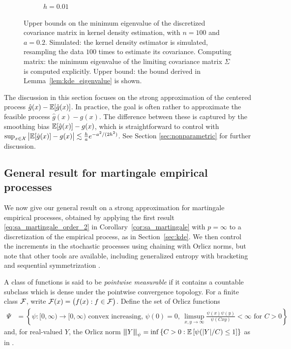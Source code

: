 \begin{figure}[ht]
\begin{subfigure}{0.49\textwidth}
    \caption{$h = 0.01$}
  \end{subfigure}
  \caption{
    Upper bounds on the minimum eigenvalue of the discretized covariance
    matrix in kernel density estimation,
    with $n=100$ and $a = 0.2$.
    Simulated: the kernel density estimator is simulated,
    resampling the data $100$ times
    to estimate its covariance.
    Computing matrix: the minimum eigenvalue of the limiting covariance
    matrix $\Sigma$ is computed explicitly.
    Upper bound: the bound derived in
    Lemma~\ref{lem:kde_eigenvalue}
    is shown.
  }
  \label{fig:min_eig}
\end{figure}

The discussion in this section focuses on the strong approximation of the
centered process $\hat g(x)-\mathbb{E} [ \hat g(x) ]$. In practice, the goal is often
rather to approximate the feasible process $\hat g(x)- g(x)$. The difference
between these is captured by the smoothing bias $\mathbb{E} [ \hat g(x) ] - g(x)$,
which is straightforward to control with
$\sup_{x \in \mathcal{X}} \big| \mathbb{E} [ \hat g(x) ] - g(x) \big|
\lesssim \frac{h}{a} e^{-a^2 / (2 h^2)}$.
See Section \ref{sec:nonparametric} for further
discussion.

\subsection{General result for martingale empirical processes}

We now give our general result on a strong approximation for
martingale empirical processes, obtained by applying
the first result \eqref{eq:sa_martingale_order_2} in
Corollary~\ref{cor:sa_martingale} with $p=\infty$
to a discretization of the empirical process,
as in Section~\ref{sec:kde}.
We then control the increments in the stochastic processes
using chaining with Orlicz norms,
but note that other tools are available,
including generalized entropy with bracketing \citep{geer2000empirical}
and sequential symmetrization \citep{rakhlin2015sequential}.

A class of functions is said to be \emph{pointwise measurable}
if it contains a countable subclass which is dense under
the pointwise convergence topology.
For a finite class $\mathcal{F}$, write
$\mathcal{F}(x) = \big(f(x) : f \in \mathcal{F}\big)$.
Define the set of Orlicz functions
%
\begin{align*}
  \Psi
  &=
  \left\{
    \psi: [0, \infty) \to [0, \infty)
    \text{ convex increasing, }
    \psi(0) = 0,\
    \limsup_{x,y \to \infty} \tfrac{\psi(x) \psi(y)}{\psi(C x y)} < \infty
    \text{ for } C > 0
  \right\}
\end{align*}
%
and, for real-valued $Y$, the Orlicz norm
${\vert\kern-0.25ex\vert\kern-0.25ex\vert} Y {\vert\kern-0.25ex\vert\kern-0.25ex\vert}_\psi
= \inf
\left\{ C > 0:
  \mathbb{E} \left[ \psi(|Y|/C) \leq 1 \right]
\right\}$
as in \citet[Section~2.2]{van1996weak}.

